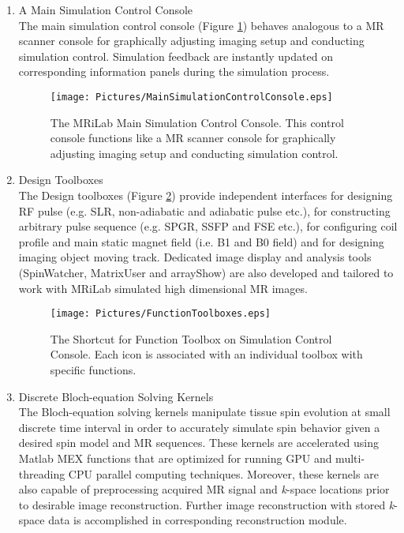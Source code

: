 \documentclass{book}%
\begin{document}
\begin{enumerate}
\item A Main Simulation Control Console \\
The main simulation control console (Figure \ref{fig:MainSimulationControlConsole}) behaves analogous to a MR scanner console for graphically adjusting imaging setup and conducting simulation control. Simulation feedback are instantly updated on corresponding information panels during the simulation process.

\begin{figure}[htbp]
	\centering
		\texttt{[image: Pictures/MainSimulationControlConsole.eps]}
	\caption{The MRiLab Main Simulation Control Console. This control console functions like a MR scanner console for graphically adjusting imaging setup and conducting simulation control.}
	\label{fig:MainSimulationControlConsole}
\end{figure}


\item Design Toolboxes \\
The Design toolboxes (Figure \ref{fig:FunctionToolboxes}) provide independent interfaces for designing RF pulse (e.g. SLR, non-adiabatic and adiabatic pulse etc.), for constructing arbitrary pulse sequence (e.g. SPGR, SSFP and FSE etc.), for configuring coil profile and main static magnet field (i.e. B1 and B0 field) and for designing imaging object moving track. Dedicated image display and analysis tools (SpinWatcher, MatrixUser and arrayShow) are also developed and tailored to work with MRiLab simulated high dimensional MR images.


\begin{figure}[htbp]
	\centering
		\texttt{[image: Pictures/FunctionToolboxes.eps]}
	\caption{The Shortcut for Function Toolbox on Simulation Control Console. Each icon is associated with an individual toolbox with specific functions.}
	\label{fig:FunctionToolboxes}
\end{figure}


\item Discrete Bloch-equation Solving Kernels \\
The Bloch-equation solving kernels manipulate tissue spin evolution at small discrete time interval in order to accurately simulate spin behavior given a desired spin model and MR sequences. These kernels are accelerated using Matlab MEX functions that are optimized for running GPU and multi-threading CPU parallel computing techniques. Moreover, these kernels are also capable of preprocessing acquired MR signal and \textit{k}-space locations prior to desirable image reconstruction. Further image reconstruction with stored \textit{k}-space data is accomplished in corresponding reconstruction module.


\end{enumerate}
\end{document}
